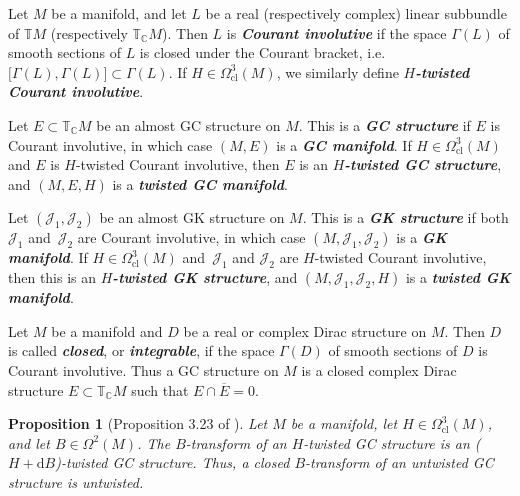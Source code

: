 \documentclass[11pt]{article}
\newtheorem{Proposition}[Theorem]{Proposition}
\numberwithin{equation}{section}
\newcommand{\deff}[1]{\textbf{\emph{#1}}}
\newcommand{\pont}[1]{\mathbb{T} {#1}}
\newcommand{\cpont}[1]{\mathbb{T}_{\mathbb{C}} {#1}}
\begin{document}
\begin{Definition}
Let $M$ be a manifold, and let $L$ be a real (respectively complex) linear subbundle of $\pont{M}$ (respectively $\cpont{M}$).  Then $L$ is \deff{Courant involutive} if the space $\Gamma(L)$ of smooth sections of $L$ is closed under the Courant bracket, i.e. $\big[ \Gamma(L), \Gamma(L) \big] \subset \Gamma(L)$.  If $H \in \Omega_{\text{cl}}^3(M)$, we similarly def\/ine \deff{$H$-twisted Courant involutive}.

Let $E \subset \cpont{M}$ be an almost GC structure on $M$.  This is a \deff{GC structure} if $E$ is Courant involutive, in which case $(M,E)$ is a \deff{GC manifold}.  If $H \in \Omega_{\text{cl}}^3(M)$ and $E$ is $H$-twisted Courant involutive, then $E$ is an \deff{$H$-twisted GC structure}, and $(M,E,H)$ is a \deff{twisted GC manifold}.

Let $(\mathcal{J}_1, \mathcal{J}_2)$ be an almost GK structure on $M$.  This is a \deff{GK structure} if both $\mathcal{J}_1$ and~$\mathcal{J}_2$ are Courant involutive, in which case $(M,\mathcal{J}_1,\mathcal{J}_2)$ is a \deff{GK manifold}.  If $H \in \Omega_{\text{cl}}^3(M)$ and~$\mathcal{J}_1$ and $\mathcal{J}_2$ are $H$-twisted Courant involutive, then this is an \deff{$H$-twisted GK structure}, and $(M,\mathcal{J}_1,\mathcal{J}_2,H)$ is a \deff{twisted GK manifold}.
\end{Definition}


\begin{Remark}
Let $M$ be a manifold and $D$ be a real or complex Dirac structure on $M$.  Then $D$ is called \deff{closed}, or \deff{integrable}, if the space $\Gamma(D)$ of smooth sections of $D$ is Courant involutive.  Thus a GC structure on $M$ is a closed complex Dirac structure $E \subset \cpont{M}$ such that $E \cap \overline{E} = 0$.
\end{Remark}


\begin{Proposition}[Proposition 3.23 of \cite{gualtieri}]
Let $M$ be a manifold, let $H \in \Omega_{\text{cl}}^3(M)$, and let $B \in \Omega^2(M)$.  The $B$-transform of an $H$-twisted GC structure is an ($H + \mathrm{d} B$)-twisted GC structure.  Thus, a closed $B$-transform of an untwisted GC structure is untwisted.
\end{Proposition}
\end{document}
